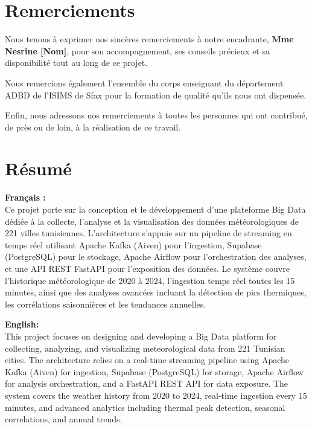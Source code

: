 \documentclass[a4paper,12pt,oneside]{report}
\begin{document}
\chapter*{Remerciements}

Nous tenons à exprimer nos sincères remerciements à notre encadrante, \textbf{Mme Nesrine [Nom]}, pour son accompagnement, ses conseils précieux et sa disponibilité tout au long de ce projet.

Nous remercions également l'ensemble du corps enseignant du département ADBD de l'ISIMS de Sfax pour la formation de qualité qu'ils nous ont dispensée.

Enfin, nous adressons nos remerciements à toutes les personnes qui ont contribué, de près ou de loin, à la réalisation de ce travail.

\newpage

\chapter*{Résumé}

\textbf{Français :}\\
Ce projet porte sur la conception et le développement d'une plateforme Big Data dédiée à la collecte, l'analyse et la visualisation des données météorologiques de 221 villes tunisiennes. L'architecture s'appuie sur un pipeline de streaming en temps réel utilisant Apache Kafka (Aiven) pour l'ingestion, Supabase (PostgreSQL) pour le stockage, Apache Airflow pour l'orchestration des analyses, et une API REST FastAPI pour l'exposition des données. Le système couvre l'historique météorologique de 2020 à 2024, l'ingestion temps réel toutes les 15 minutes, ainsi que des analyses avancées incluant la détection de pics thermiques, les corrélations saisonnières et les tendances annuelles.

\vspace{0.8cm}
\textbf{English:}\\
This project focuses on designing and developing a Big Data platform for collecting, analyzing, and visualizing meteorological data from 221 Tunisian cities. The architecture relies on a real-time streaming pipeline using Apache Kafka (Aiven) for ingestion, Supabase (PostgreSQL) for storage, Apache Airflow for analysis orchestration, and a FastAPI REST API for data exposure. The system covers the weather history from 2020 to 2024, real-time ingestion every 15 minutes, and advanced analytics including thermal peak detection, seasonal correlations, and annual trends.
\end{document}
